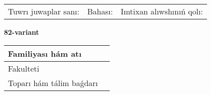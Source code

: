 \documentclass{article}
\begin{document}
\vspace{1cm}

\begin{tabular}{lll}
Tuwrı juwaplar sanı: \underline{\hspace{1.5cm}} & 
Bahası: \underline{\hspace{1.5cm}} & 
Imtixan alıwshınıń qolı: \underline{\hspace{2cm}} \\
\end{tabular}

\egroup

\newpage


\textbf{82-variant}\\

\bgroup
\def\arraystretch{1.6} %

\begin{tabular}{|m{5.7cm}|m{9.5cm}|}
\hline
Familiyası hám atı & \\
\hline
Fakulteti  & \\
\hline
Toparı hám tálim baǵdarı  & \\
\hline
\end{tabular}

\vspace{1cm}
\end{document}

